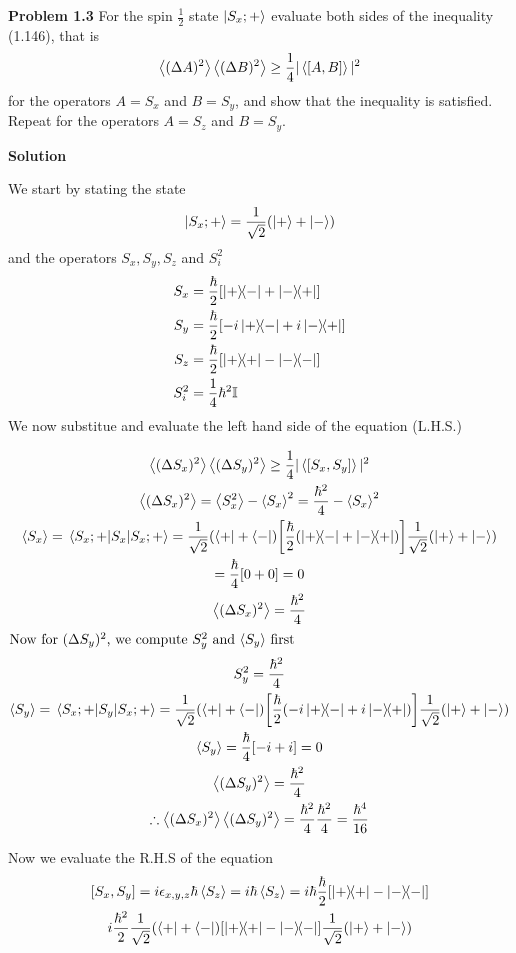 \item \textbf{Problem 1.3} 
For the spin $\frac12$ state $\ket{S_x;+}$ evaluate both sides of the inequality (1.146), that is
$$ \ev{(\Delta A)^2} \ev{(\Delta B)^2} \geq \frac14 |\ev{\comm{A}{B}}|^2$$ 
for the operators $A = S_x$ and $B = S_y$, and show that the inequality is satisfied. Repeat for the operators $A = S_z$ and $B = S_y$.

\vspace{1cm}
\textbf{Solution}

We start by stating the state $$\ket{S_x;+} = \frac{1}{\sqrt{2}} \qty(\ket + + \ket -)$$ and the operators $S_x,S_y,S_z$ and $S_i^2$
\begin{align*}
    S_x &= \frac{\hbar}{2} \qty[\op{+}{-} + \ketbra{-}{+}]\\
    S_y &= \frac{\hbar}{2} \qty[-i\op{+}{-} + i\ketbra{-}{+}]\\
    S_z &= \frac{\hbar}{2} \qty[\op{+}{+} - \ketbra{-}]\\
    S_i^2 &= \frac14 \hbar^2\mathbb{I}
\end{align*}
We now substitue and evaluate the left hand side of the equation (L.H.S.)

\begin{gather*}
    \ev{(\Delta S_x)^2}\ev{(\Delta S_y)^2} \ge \frac{1}{4} | \ev{\comm{S_x}{S_y}} |^2\\
    \ev{(\Delta S_x)^2} = \ev{S_x^2} - \ev{S_x}^2 = \frac{\hbar^2}{4} - \ev{S_x}^2\\
    \ev{S_x} = \ev{S_x}{S_x;+} = \frac{1}{\sqrt{2}} \qty(\bra + + \bra -) \qty[\frac{\hbar}{2} \qty(\op{+}{-} + \ketbra{-}{+})]\frac{1}{\sqrt{2}} \qty(\ket + + \ket -)\\
     = \frac\hbar4 \qty[0 + 0] = 0\\
    \ev{(\Delta S_x)^2} = \frac{\hbar^2}{4}\\
    \intertext{Now for $(\Delta S_y)^2$, we compute $S_y^2$ and $\ev{S_y}$ first}
    S_y^2 = \frac{\hbar^2}{4}\\
    \ev{S_y} = \ev{S_y}{S_x;+} =  \frac{1}{\sqrt{2}} \qty(\bra + + \bra -) \qty[\frac{\hbar}{2} \qty(-i\op{+}{-} + i\ketbra{-}{+})]\frac{1}{\sqrt{2}} \qty(\ket + + \ket -)\\
    \ev{S_y}= \frac{\hbar}{4} \qty[-i+i] = 0 \\
    \ev{(\Delta S_y)^2} = \frac{\hbar^2}{4}\\
    \therefore \ev{(\Delta S_x)^2}\ev{(\Delta S_y)^2} = \frac{\hbar^2}{4}\frac{\hbar^2}{4} = \frac{\hbar^4}{16}
\end{gather*}


Now we evaluate the R.H.S of the equation
\begin{gather*}
    \comm{S_x}{S_y} = i\epsilon_{x,y,z} \hbar \ev{S_z} = i\hbar \ev{S_z} = i \hbar \frac{\hbar}{2} \qty[\op{+}{+} - \ketbra{-}]\\
    i\frac{\hbar^2}{2}  \frac{1}{\sqrt{2}} \qty(\bra + + \bra -) \qty[\op{+}{+} - \ketbra{-}]\frac{1}{\sqrt{2}} \qty(\ket + + \ket -)
\end{gather*}